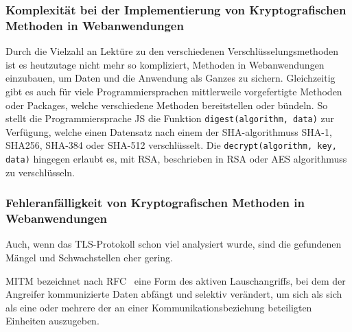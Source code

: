 \subsubsection{Komplexität bei der Implementierung von Kryptografischen Methoden in Webanwendungen}\label{subsubsec:komplexitaet_bei_der_implementierung_von_Kryptografischen_methoden_in_webanwendungen}
Durch die Vielzahl an Lektüre zu den verschiedenen Verschlüsselungsmethoden\autocites[\zb][]{davies2011implementing} ist es heutzutage nicht mehr so kompliziert,  Methoden in Webanwendungen einzubauen, um Daten und die Anwendung als Ganzes zu sichern.
Gleichzeitig gibt es auch für viele Programmiersprachen mittlerweile vorgefertigte Methoden oder Packages, welche verschiedene  Methoden bereitstellen oder bündeln. So stellt die Programmiersprache \ac{JS} die Funktion \lstinline!digest(algorithm, data)! zur Verfügung, welche einen Datensatz nach einem der \ac{SHA}-\glspl{algorithmus} \ac{SHA}-1, \gls{SHA256}, \ac{SHA}-384 oder \ac{SHA}-512 verschlüsselt.\autocite[\vglf][]{SubtleCr83:online} Die \lstinline!decrypt(algorithm, key, data)! hingegen erlaubt es, mit RSA, beschrieben in \ac{RSA} oder \ac{AES} \glspl{algorithmus} zu verschlüsseln.

\subsubsection{Fehleranfälligkeit von Kryptografischen Methoden in Webanwendungen}\label{subsubsec:fehleranfälligkeit_von_Kryptografischen_methoden_in_webanwendungen}
Auch, wenn das \ac{TLS}-Protokoll schon viel analysiert wurde\autocites[Siehe \zb][]{krawczyk2013security, paulson1999inductive, dowling2015cryptographic, cremers2017comprehensive}, sind die gefundenen Mängel und Schwachstellen eher gering.\autocite[\vglf][]{OPPLIGER20062238} 

\begin{definition}
    \ac{MITM} bezeichnet nach \ac{RFC}\ \autocite[Übersetzt aus][]{rfc2828} eine Form des aktiven Lauschangriffs, bei dem der Angreifer kommunizierte Daten abfängt und selektiv verändert, um sich als sich als eine oder mehrere der an einer Kommunikationsbeziehung beteiligten Einheiten auszugeben.
\end{definition}

